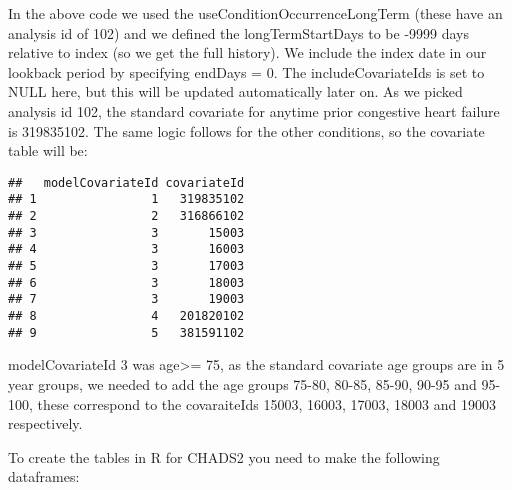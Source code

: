 \documentclass[]{article}
\begin{document}
In the above code we used the useConditionOccurrenceLongTerm (these have
an analysis id of 102) and we defined the longTermStartDays to be -9999
days relative to index (so we get the full history). We include the
index date in our lookback period by specifying endDays = 0. The
includeCovariateIds is set to NULL here, but this will be updated
automatically later on. As we picked analysis id 102, the standard
covariate for anytime prior congestive heart failure is 319835102. The
same logic follows for the other conditions, so the covariate table will
be:

\begin{verbatim}
##   modelCovariateId covariateId
## 1                1   319835102
## 2                2   316866102
## 3                3       15003
## 4                3       16003
## 5                3       17003
## 6                3       18003
## 7                3       19003
## 8                4   201820102
## 9                5   381591102
\end{verbatim}

modelCovariateId 3 was age\textgreater{}= 75, as the standard covariate
age groups are in 5 year groups, we needed to add the age groups 75-80,
80-85, 85-90, 90-95 and 95-100, these correspond to the covaraiteIds
15003, 16003, 17003, 18003 and 19003 respectively.

To create the tables in R for CHADS2 you need to make the following
dataframes:
\end{document}
